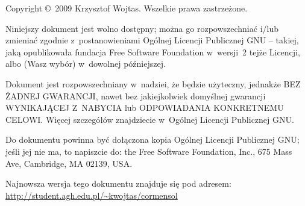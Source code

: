 		\vspace{10ex}

		\begin{small}
			Copyright \copyright\ 2009 Krzysztof Wojtas. Wszelkie prawa zastrzeżone.

			Niniejszy dokument jest wolno dostępny; można go rozpowszechniać i/lub zmieniać zgodnie z~postanowieniami Ogólnej Licencji Publicznej GNU -- takiej, jaką opublikowała fundacja Free Software Foundation w~wersji~2 tejże Licencji, albo (Wasz wybór) w~dowolnej późniejszej.

			Dokument jest rozpowszechniany w~nadziei, że będzie użyteczny, jednakże BEZ ŻADNEJ GWARANCJI, nawet bez jakiejkolwiek domyślnej gwarancji WYNIKAJĄCEJ Z~NABYCIA lub ODPOWIADANIA KONKRETNEMU CELOWI. Więcej szczegółów znajdziecie w~Ogólnej Licencji Publicznej GNU.

			Do dokumentu powinna być dołączona kopia Ogólnej Licencji Publicznej GNU; jeśli jej nie ma, to napiszcie do: the Free Software Foundation, Inc., 675 Mass Ave, Cambridge, MA 02139, USA.
		\end{small}

	\endgroup


	\noindent Najnowsza wersja tego dokumentu znajduje się pod adresem:\\
	\url{http://student.agh.edu.pl/~kwojtas/cormensol}

	\newpage

\endgroup

\endinput
